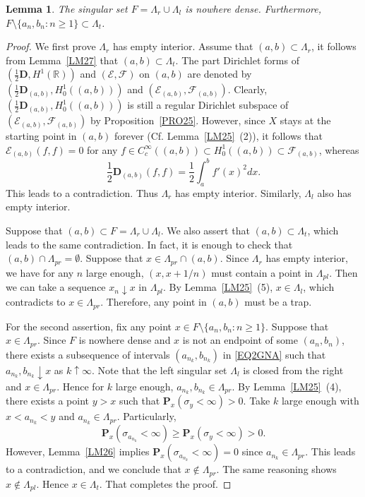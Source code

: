 \documentclass[a4paper]{amsart}
\newtheorem{lemma}[theorem]{Lemma}
\theoremstyle{definition}
\theoremstyle{remark}
\numberwithin{equation}{section}
\begin{document}
\begin{lemma}\label{LM29}
The singular set $F=\Lambda_r\cup \Lambda_l$ is nowhere dense. Furthermore, $F\setminus \{a_n,b_n: n\geq 1\}\subset \Lambda_t$.
\end{lemma}
\begin{proof}
We first prove $\Lambda_r$ has empty interior. Assume that $(a,b)\subset \Lambda_r$, it follows from Lemma~\ref{LM27} that $(a,b)\subset \Lambda_t$. The part Dirichlet forms of $(\frac{1}{2}\mathbf{D}, H^1(\mathbb{R}))$ and $({{\mathcal{E}}},{{\mathcal{F}}})$ on $(a,b)$ are denoted by $(\frac{1}{2}\mathbf{D}_{(a,b)}, H^1_0((a,b)))$ and $({{\mathcal{E}}}_{(a,b)},{{\mathcal{F}}}_{(a,b)})$. Clearly,  $(\frac{1}{2}\mathbf{D}_{(a,b)}, H^1_0((a,b)))$ is still a regular Dirichlet subspace of $({{\mathcal{E}}}_{(a,b)},{{\mathcal{F}}}_{(a,b)})$ by Proposition~\ref{PRO25}. However, since $X$ stays at the starting point in $(a,b)$ forever (Cf. Lemma~\ref{LM25}~(2)), it follows that ${{\mathcal{E}}}_{(a,b)}(f,f)=0$ for any $f\in C_c^\infty((a,b))\subset H^1_0((a,b))\subset {{\mathcal{F}}}_{(a,b)}$, whereas
\[
	\frac{1}{2}\mathbf{D}_{(a,b)}(f,f)=\frac{1}{2}\int_a^b f'(x)^2dx.
\]
This leads to a contradiction. Thus $\Lambda_r$ has empty interior. Similarly, $\Lambda_l$ also has empty interior.

Suppose that $(a,b)\subset F=\Lambda_r\cup \Lambda_l$. We also assert that $(a,b)\subset \Lambda_t$, which leads to the same contradiction. In fact, it is enough to check that $(a,b)\cap \Lambda_{pr}=\emptyset$. Suppose that $x\in \Lambda_{pr} \cap (a,b)$. Since $\Lambda_r$ has empty interior, we have for any $n$ large enough, $(x, x+1/n)$ must contain a point in $\Lambda_{pl}$. Then we can take a sequence $x_n \downarrow x$ in $\Lambda_{pl}$. By Lemma~\ref{LM25}~(5), $x\in \Lambda_l$, which contradicts to $x\in \Lambda_{pr}$. Therefore, any point in $(a,b)$ must be a trap.

For the second assertion, fix any point $x\in F\setminus \{a_n,b_n:n\ge 1\}$. Suppose that $x\in \Lambda_{pr}$. Since $F$ is nowhere dense and $x$ is not an endpoint of some $(a_n,b_n)$, there exists a subsequence of intervals $(a_{n_k},b_{n_k})$ in \eqref{EQ2GNA} such that $a_{n_k}, b_{n_k}\downarrow x$ as $k\uparrow \infty$. Note that the left singular set $\Lambda_l$ is closed from the right and $x\in \Lambda_{pr}$. Hence for $k$ large enough, $a_{n_k}, b_{n_k}\in \Lambda_{pr}$. By Lemma~\ref{LM25}~(4), there exists a point $y>x$ such that $
	\mathbf{P}_x(\sigma_y<\infty)>0$.
Take $k$ large enough with $x<a_{n_k}<y$ and $a_{n_k}\in \Lambda_{pr}$. Particularly,
\[
	\mathbf{P}_x(\sigma_{a_{n_k}}<\infty) \geq \mathbf{P}_x(\sigma_y<\infty)>0.
\]
However, Lemma~\ref{LM26} implies $\mathbf{P}_x(\sigma_{a_{n_k}}<\infty)=0$ since $a_{n_k}\in \Lambda_{pr}$. This leads to a contradiction, and we conclude that $x\not\in \Lambda_{pr}$. The same reasoning shows $x\not\in\Lambda_{pl}$.
Hence $x\in \Lambda_t$. That completes the proof.
\end{proof}
\end{document}

